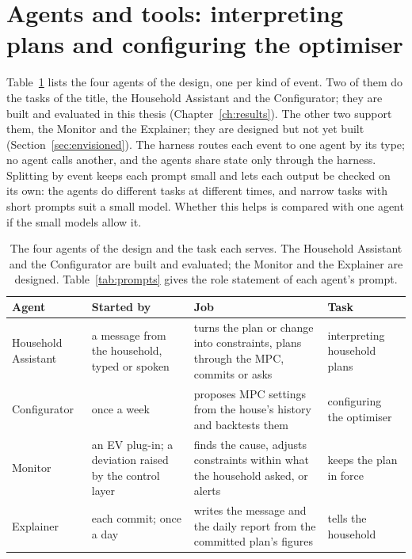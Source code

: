 \section{Agents and tools: interpreting plans and configuring the optimiser}
\label{sec:agents}

Table~\ref{tab:agents} lists the four agents of the design, one per
kind of event. Two of them do the tasks of the title, the Household
Assistant and the Configurator; they are built and evaluated in this
thesis (Chapter~\ref{ch:results}). The other two support them, the
Monitor and the Explainer; they are designed but not yet built
(Section~\ref{sec:envisioned}). The harness routes each event
to one agent by its type; no agent calls another, and the agents share
state only through the harness. Splitting by event keeps each prompt
small and lets each output be checked on its own: the agents do
different tasks at different times, and narrow tasks with short prompts
suit a small model. Whether this helps is compared with one agent if the small
models allow it.

\begin{table}[htbp]
\caption{The four agents of the design and the task each serves. The
Household Assistant and the Configurator are built and evaluated; the
Monitor and the Explainer are designed. Table~\ref{tab:prompts}
gives the role statement of each agent's prompt.}
\label{tab:agents}
\small
\begin{tabularx}{\textwidth}{@{}>{\raggedright\arraybackslash}p{2.6cm}>{\raggedright\arraybackslash}p{2.9cm}X>{\raggedright\arraybackslash}p{2.4cm}@{}}
\toprule
Agent & Started by & Job & Task \\
\midrule
Household Assistant & a message from the household, typed or spoken & turns the plan or change into constraints, plans through the MPC, commits or asks & interpreting household plans \\
Configurator & once a week & proposes MPC settings from the house's history and backtests them & configuring the optimiser \\
Monitor & an EV plug-in; a deviation raised by the control layer & finds the cause, adjusts constraints within what the household asked, or alerts & keeps the plan in force \\
Explainer & each commit; once a day & writes the message and the daily report from the committed plan's figures & tells the household \\
\bottomrule
\end{tabularx}
\end{table}


